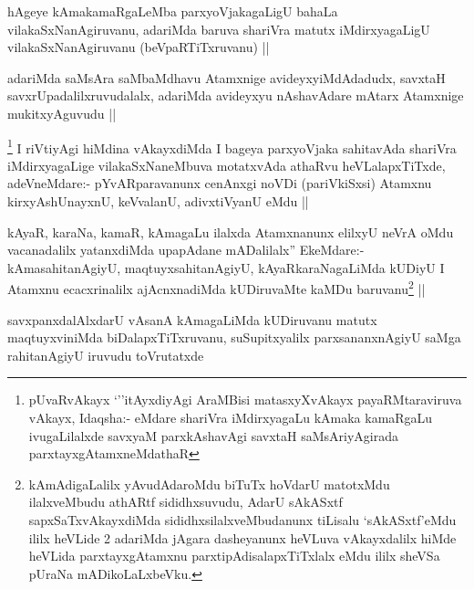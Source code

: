 
\begin{artha}
hAgeye kAmakamaRgaLeMba parxyoVjakagaLigU bahaLa vilakaSxNanAgiruvanu, adariMda baruva shariVra matutx iMdirxyagaLigU vilakaSxNanAgiruvanu (beVpaRTiTxruvanu) ||
\end{artha}

\begin{artha}
adariMda saMsAra saMbaMdhavu Atamxnige avideyxyiMdAdadudx, savxtaH savxrUpadalilxruvudalalx, adariMda avideyxyu nAshavAdare mAtarx Atamxnige mukitxyAguvudu ||
\end{artha}

\begin{artha}
\footnote{pUvaRvAkayx `\stext''itAyxdiyAgi AraMBisi matasxyXvAkayx payaRMtaraviruva vAkayx, Idaqsha:- eMdare shariVra iMdirxyagaLu kAmaka kamaRgaLu ivugaLilalxde savxyaM parxkAshavAgi savxtaH saMsAriyAgirada parxtayxgAtamxneMdathaR}
I riVtiyAgi hiMdina vAkayxdiMda I bageya parxyoVjaka sahitavAda shariVra iMdirxyagaLige vilakaSxNaneMbuva motatxvAda athaRvu heVLalapxTiTxde, adeVneMdare:-
pYvARparavanunx cenAnxgi noVDi (pariVkiSxsi) Atamxnu kirxyAshUnayxnU, keVvalanU, adivxtiVyanU eMdu ||
\end{artha}


\begin{artha}
kAyaR, karaNa, kamaR, kAmagaLu ilalxda Atamxnanunx elilxyU neVrA oMdu vacanadalilx yatanxdiMda upapAdane mADalilalx'' EkeMdare:- kAmasahitanAgiyU, maqtuyxsahitanAgiyU, kAyaRkaraNagaLiMda kUDiyU I Atamxnu ecacxrinalilx ajAcnxnadiMda kUDiruvaMte kaMDu baruvanu\footnote{kAmAdigaLalilx yAvudAdaroMdu biTuTx hoVdarU matotxMdu ilalxveMbudu athARtf sididhxsuvudu, AdarU sAkASxtf sapxSaTxvAkayxdiMda sididhxsilalxveMbudanunx tiLisalu `sAkASxtf'eMdu ililx heVLide 2 adariMda jAgara dasheyanunx heVLuva vAkayxdalilx hiMde heVLida parxtayxgAtamxnu parxtipAdisalapxTiTxlalx eMdu ililx sheVSa pUraNa mADikoLaLxbeVku.} ||
\end{artha}


\begin{artha}
savxpanxdalAlxdarU vAsanA kAmagaLiMda kUDiruvanu matutx maqtuyxviniMda biDalapxTiTxruvanu, suSupitxyalilx parxsananxnAgiyU saMga rahitanAgiyU iruvudu toVrutatxde
\end{artha}

